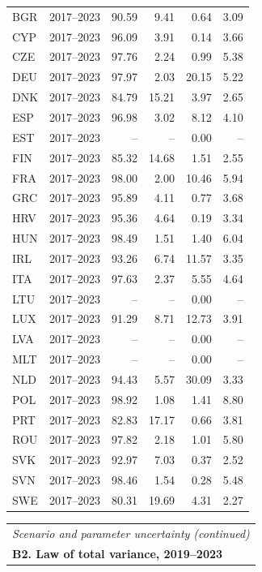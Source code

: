 {\begin{longtable}{@{}lrrrrr@{}}
BGR & 2017–2023 & 90.59 &  9.41 &  0.64 &  3.09 \\
CYP & 2017–2023 & 96.09 &  3.91 &  0.14 &  3.66 \\
CZE & 2017–2023 & 97.76 &  2.24 &  0.99 &  5.38 \\
DEU & 2017–2023 & 97.97 &  2.03 & 20.15 &  5.22 \\
DNK & 2017–2023 & 84.79 & 15.21 &  3.97 &  2.65 \\
ESP & 2017–2023 & 96.98 &  3.02 &  8.12 &  4.10 \\
EST & 2017–2023 & -- & -- &  0.00 & -- \\
FIN & 2017–2023 & 85.32 & 14.68 &  1.51 &  2.55 \\
FRA & 2017–2023 & 98.00 &  2.00 & 10.46 &  5.94 \\
GRC & 2017–2023 & 95.89 &  4.11 &  0.77 &  3.68 \\
HRV & 2017–2023 & 95.36 &  4.64 &  0.19 &  3.34 \\
HUN & 2017–2023 & 98.49 &  1.51 &  1.40 &  6.04 \\
IRL & 2017–2023 & 93.26 &  6.74 & 11.57 &  3.35 \\
ITA & 2017–2023 & 97.63 &  2.37 &  5.55 &  4.64 \\
LTU & 2017–2023 & -- & -- &  0.00 & -- \\
LUX & 2017–2023 & 91.29 &  8.71 & 12.73 &  3.91 \\
LVA & 2017–2023 & -- & -- &  0.00 & -- \\
MLT & 2017–2023 & -- & -- &  0.00 & -- \\
NLD & 2017–2023 & 94.43 &  5.57 & 30.09 &  3.33 \\
POL & 2017–2023 & 98.92 &  1.08 &  1.41 &  8.80 \\
PRT & 2017–2023 & 82.83 & 17.17 &  0.66 &  3.81 \\
ROU & 2017–2023 & 97.82 &  2.18 &  1.01 &  5.80 \\
SVK & 2017–2023 & 92.97 &  7.03 &  0.37 &  2.52 \\
SVN & 2017–2023 & 98.46 &  1.54 &  0.28 &  5.48 \\
SWE & 2017–2023 & 80.31 & 19.69 &  4.31 &  2.27 \\
\end{longtable}
\addtocounter{table}{-1}
\begin{longtable}{@{}lrrrrr@{}}
\multicolumn{6}{l}{\textit{Scenario and parameter uncertainty (continued)}} \\
\multicolumn{6}{l}{\textbf{B2. Law of total variance, 2019–2023}} \\

\end{longtable}}
